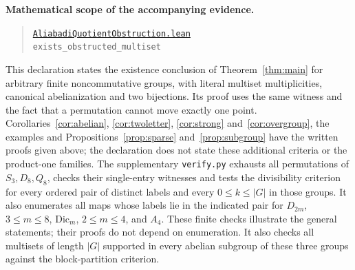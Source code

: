 \documentclass[11pt]{article}
\begin{document}
\medskip\noindent\textbf{Mathematical scope of the accompanying evidence.}
\begin{quote}\small
\href{https://github.com/the-omega-institute/trureturing/blob/1154841a3345ca579e0d56fc4ceebee38814557c/D5/S3/FiniteGroups/AliabadiQuotientObstruction.lean}{\texttt{AliabadiQuotientObstruction.lean}}
\\\texttt{exists\_obstructed\_multiset}
\end{quote}
This declaration states the existence conclusion of Theorem~\ref{thm:main} for arbitrary
finite noncommutative groups, with literal multiset multiplicities,
canonical abelianization and two bijections. Its proof uses the same
witness and the fact that a permutation cannot move exactly one point.
Corollaries~\ref{cor:abelian}, \ref{cor:twoletter}, \ref{cor:strong}
and~\ref{cor:overgroup},
the examples and Propositions~\ref{prop:sparse} and~\ref{prop:subgroup}
have the written proofs given above; the declaration does not state
these additional criteria or the product-one families.
The supplementary \texttt{verify.py} exhausts all permutations of
$S_3,D_8,Q_8$, checks their single-entry witnesses and tests the
divisibility criterion for every ordered pair of distinct labels and every
$0\leq k\leq|G|$ in those groups. It also enumerates all maps whose
labels lie in the indicated pair for $D_{2m}$, $3\leq m\leq8$,
$\mathrm{Dic}_m$, $2\leq m\leq4$, and $A_4$.
These finite checks illustrate the
general statements; their proofs do not depend on enumeration.
It also checks all multisets of length $|G|$ supported in every abelian
subgroup of these three groups against the block-partition criterion.
\end{document}
